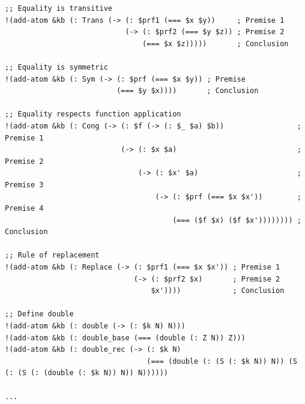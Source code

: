 \documentclass[aspectratio=169]{beamer}
\begin{document}
\begin{frame}[fragile]

  \begin{lstlisting}
;; Equality is transitive
!(add-atom &kb (: Trans (-> (: $prf1 (=== $x $y))     ; Premise 1
                            (-> (: $prf2 (=== $y $z)) ; Premise 2
                                (=== $x $z)))))       ; Conclusion

;; Equality is symmetric
!(add-atom &kb (: Sym (-> (: $prf (=== $x $y)) ; Premise
                          (=== $y $x))))       ; Conclusion

;; Equality respects function application
!(add-atom &kb (: Cong (-> (: $f (-> (: $_ $a) $b))                 ; Premise 1
                           (-> (: $x $a)                            ; Premise 2
                               (-> (: $x' $a)                       ; Premise 3
                                   (-> (: $prf (=== $x $x'))        ; Premise 4
                                       (=== ($f $x) ($f $x')))))))) ; Conclusion

;; Rule of replacement
!(add-atom &kb (: Replace (-> (: $prf1 (=== $x $x')) ; Premise 1
                              (-> (: $prf2 $x)       ; Premise 2
                                  $x'))))            ; Conclusion

;; Define double
!(add-atom &kb (: double (-> (: $k N) N)))
!(add-atom &kb (: double_base (=== (double (: Z N)) Z)))
!(add-atom &kb (: double_rec (-> (: $k N)
                                 (=== (double (: (S (: $k N)) N)) (S (: (S (: (double (: $k N)) N)) N))))))

...
  \end{lstlisting}

\end{frame}
\end{document}
